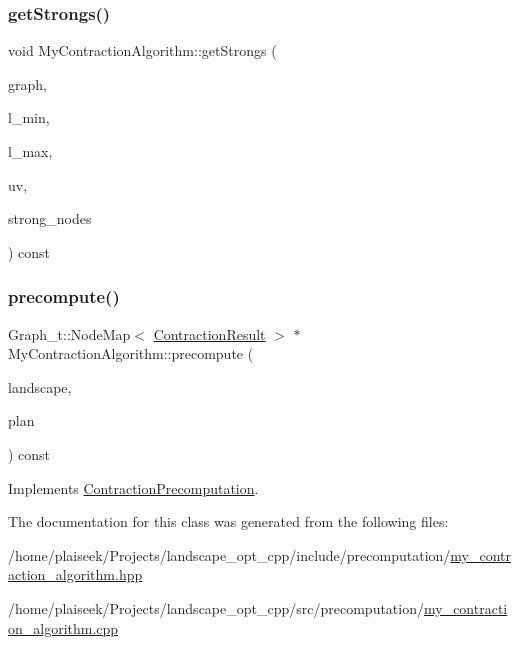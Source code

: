 \subsubsection{\texorpdfstring{get\+Strongs()}{getStrongs()}}
{\footnotesize\ttfamily void My\+Contraction\+Algorithm\+::get\+Strongs (\begin{DoxyParamCaption}\item[{const \hyperlink{pl__reff_8cpp_a65aea14f39d53b24df9910d54216d620}{Graph\+\_\+t} \&}]{graph,  }\item[{const Graph\+\_\+t\+::\+Arc\+Map$<$ double $>$ \&}]{l\+\_\+min,  }\item[{const Graph\+\_\+t\+::\+Arc\+Map$<$ double $>$ \&}]{l\+\_\+max,  }\item[{Graph\+\_\+t\+::\+Arc}]{uv,  }\item[{std\+::vector$<$ Graph\+\_\+t\+::\+Node $>$ \&}]{strong\+\_\+nodes }\end{DoxyParamCaption}) const}

\mbox{\label{class_my_contraction_algorithm_a4583c564e68d337bd9dcef315093bbe6}} 
\subsubsection{\texorpdfstring{precompute()}{precompute()}}
{\footnotesize\ttfamily Graph\+\_\+t\+::\+Node\+Map$<$ \hyperlink{class_contraction_result}{Contraction\+Result} $>$ $\ast$ My\+Contraction\+Algorithm\+::precompute (\begin{DoxyParamCaption}\item[{const \hyperlink{class_landscape}{Landscape} \&}]{landscape,  }\item[{const \hyperlink{class_restoration_plan}{Restoration\+Plan} \&}]{plan }\end{DoxyParamCaption}) const\hspace{0.3cm}{\ttfamily [virtual]}}



Implements \hyperlink{class_contraction_precomputation_a205ee98224bfa783a7ab27d3a986468b}{Contraction\+Precomputation}.



The documentation for this class was generated from the following files\+:\begin{DoxyCompactItemize}
\item 
/home/plaiseek/\+Projects/landscape\+\_\+opt\+\_\+cpp/include/precomputation/\hyperlink{my__contraction__algorithm_8hpp}{my\+\_\+contraction\+\_\+algorithm.\+hpp}\item 
/home/plaiseek/\+Projects/landscape\+\_\+opt\+\_\+cpp/src/precomputation/\hyperlink{my__contraction__algorithm_8cpp}{my\+\_\+contraction\+\_\+algorithm.\+cpp}\end{DoxyCompactItemize}

